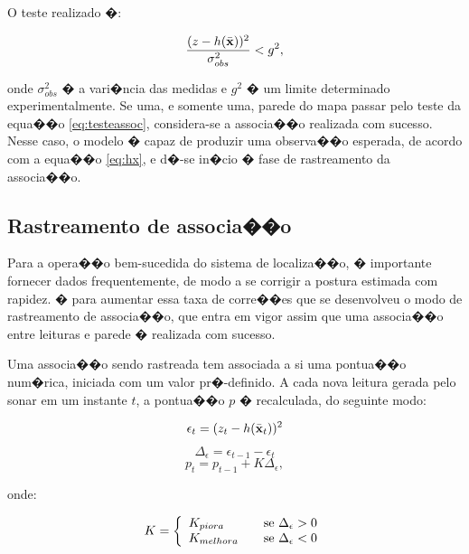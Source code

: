 O teste realizado �:

\begin{equation}
\frac{(z-h(\bar{\bf{x}}))^2}{\sigma_{obs}^2} < g^2,
\label{eq:testeassoc}
\end{equation}

onde $\sigma_{obs}^2$ � a vari�ncia das medidas e $g^2$ � um limite determinado experimentalmente. Se uma, e somente uma, parede do mapa passar pelo teste da equa��o \ref{eq:testeassoc}, considera-se a associa��o realizada com sucesso. Nesse caso, o modelo � capaz de produzir uma observa��o esperada, de acordo com a equa��o \ref{eq:hx}, e d�-se in�cio � fase de rastreamento da associa��o.

\subsection{Rastreamento de associa��o}
Para a opera��o bem-sucedida do sistema de localiza��o, � importante fornecer dados frequentemente, de modo a se corrigir a postura estimada com rapidez. � para aumentar essa taxa de corre��es que se desenvolveu o modo de rastreamento de associa��o, que entra em vigor assim que uma associa��o entre leituras e parede � realizada com sucesso.

Uma associa��o sendo rastreada tem associada a si uma pontua��o num�rica, iniciada com um valor pr�-definido. A cada nova leitura gerada pelo sonar em um instante $t$, a pontua��o $p$ � recalculada, do seguinte modo:

\begin{equation*}
	\epsilon_{t} = (z_t-h(\bar{\bf{x}}_t))^2
\end{equation*}
\begin{equation*}
	\Delta_{\epsilon} = \epsilon_{t-1} - \epsilon_{t}
\end{equation*}
\begin{equation}
	p_t = p_{t-1} + K\Delta_{\epsilon},
\end{equation}

onde:

\begin{equation}
K = \left\{ 
\begin{array}{l l}
  K_{piora} & \quad \text{se $\Delta_{\epsilon} > 0$}\\
  K_{melhora} & \quad \text{se $\Delta_{\epsilon} < 0$}\\
\end{array} \right.
\end{equation}

